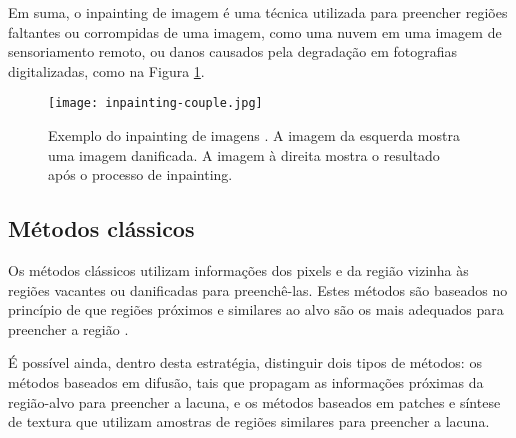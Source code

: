 Em suma, o inpainting de imagem é uma técnica utilizada para preencher regiões faltantes ou corrompidas de uma imagem, como uma nuvem em uma imagem de sensoriamento remoto, ou danos causados pela degradação em fotografias digitalizadas, como na Figura \ref{fig:inpainting-couple}.

\begin{figure}[ht]
\centering
\texttt{[image: inpainting-couple.jpg]}
\caption{Exemplo do inpainting de imagens \cite{wiki:inpainting-couple}. A imagem da esquerda mostra uma imagem danificada. A imagem à direita mostra o resultado após o processo de inpainting.}
\label{fig:inpainting-couple}
\end{figure}


\subsection{Métodos clássicos} \label{patch}
Os métodos clássicos utilizam informações dos pixels e da região vizinha às regiões  vacantes ou danificadas para preenchê-las. Estes métodos são baseados no princípio de que regiões próximos e similares ao alvo são os mais adequados para preencher a região \cite{patchmatch2009, Bertalmio2001navier}.

É possível ainda, dentro desta estratégia, distinguir dois tipos de métodos: os métodos baseados em difusão, tais que propagam as informações próximas da região-alvo para preencher a lacuna, e os métodos baseados em patches e síntese de textura que utilizam amostras de regiões similares para preencher a lacuna.

